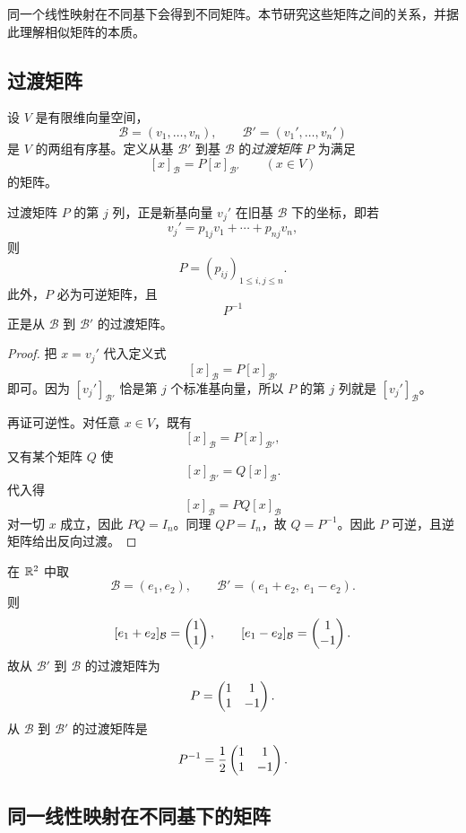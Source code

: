 同一个线性映射在不同基下会得到不同矩阵。本节研究这些矩阵之间的关系，并据此理解相似矩阵的本质。

\subsection{过渡矩阵}

\begin{definition}
设 $V$ 是有限维向量空间，
\[
  \mathcal B=(v_1,\dots,v_n),\qquad \mathcal B'=(v_1',\dots,v_n')
\]
是 $V$ 的两组有序基。定义从基 $\mathcal B'$ 到基 $\mathcal B$ 的\emph{过渡矩阵} $P$ 为满足
\[
  [x]_{\mathcal B}=P[x]_{\mathcal B'}\qquad (x\in V)
\]
的矩阵。
\end{definition}

\begin{proposition}
过渡矩阵 $P$ 的第 $j$ 列，正是新基向量 $v_j'$ 在旧基 $\mathcal B$ 下的坐标，即若
\[
  v_j'=p_{1j}v_1+\cdots+p_{nj}v_n,
\]
则
\[
  P=(p_{ij})_{1\le i,j\le n}.
\]
此外，$P$ 必为可逆矩阵，且
\[
  P^{-1}
\]
正是从 $\mathcal B$ 到 $\mathcal B'$ 的过渡矩阵。
\end{proposition}

\begin{proof}
把 $x=v_j'$ 代入定义式
\[
  [x]_{\mathcal B}=P[x]_{\mathcal B'}
\]
即可。因为 $[v_j']_{\mathcal B'}$ 恰是第 $j$ 个标准基向量，所以 $P$ 的第 $j$ 列就是 $[v_j']_{\mathcal B}$。

再证可逆性。对任意 $x\in V$，既有
\[
  [x]_{\mathcal B}=P[x]_{\mathcal B'},
\]
又有某个矩阵 $Q$ 使
\[
  [x]_{\mathcal B'}=Q[x]_{\mathcal B}.
\]
代入得
\[
  [x]_{\mathcal B}=PQ[x]_{\mathcal B}
\]
对一切 $x$ 成立，因此 $PQ=I_n$。同理 $QP=I_n$，故 $Q=P^{-1}$。因此 $P$ 可逆，且逆矩阵给出反向过渡。
\end{proof}

\begin{example}
在 $\mathbb{R}^2$ 中取
\[
  \mathcal B=(e_1,e_2),
  \qquad
  \mathcal B'=(e_1+e_2,\ e_1-e_2).
\]
则
\[
  [e_1+e_2]_{\mathcal B}=\begin{pmatrix} 1\\1 \end{pmatrix},
  \qquad
  [e_1-e_2]_{\mathcal B}=\begin{pmatrix} 1\\-1 \end{pmatrix}.
\]
故从 $\mathcal B'$ 到 $\mathcal B$ 的过渡矩阵为
\[
  P=\begin{pmatrix} 1 & 1\\ 1 & -1 \end{pmatrix}.
\]
从 $\mathcal B$ 到 $\mathcal B'$ 的过渡矩阵是
\[
  P^{-1}=\frac12\begin{pmatrix} 1 & 1\\ 1 & -1 \end{pmatrix}.
\]
\end{example}

\subsection{同一线性映射在不同基下的矩阵}

